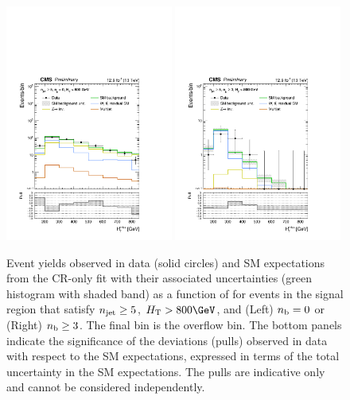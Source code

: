 \begin{figure}[tbhp]
  \begin{center}
    \includegraphics[width=0.49\textwidth]{mhtShape_eq0b_ge5j_800_Inf_fit_b.pdf} 
    \includegraphics[width=0.49\textwidth]{mhtShape_ge3b_ge5j_800_Inf_fit_b.pdf} 
  \end{center}
  \caption{Event yields observed in data (solid circles) and SM
    expectations from the CR-only fit with their associated
    uncertainties (green histogram with shaded band) as a function of
    \HTmiss for events in the signal region that satisfy $n_{\text{jet}} \geq
    5$, $\scalht > 800\GeV$, and (Left) $n_{\text{b}} = 0$ or (Right) $n_{\text{b}} \geq
    3$. The final bin is the overflow bin. The bottom panels indicate
    the significance of the deviations (pulls) observed in data with respect
    to the SM expectations, expressed in terms of the total
    uncertainty in the SM expectations. The pulls are indicative only
    and cannot be considered independently.  
    \label{fig:mht-templates} 
  }
\end{figure}
